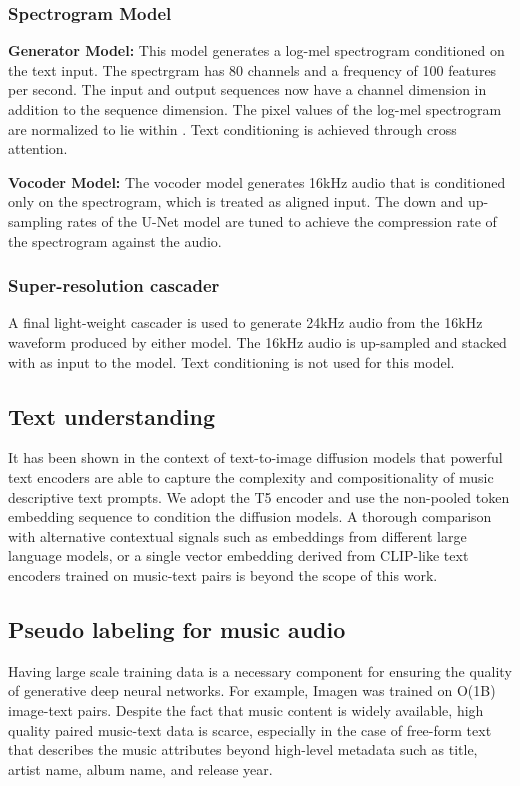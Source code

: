 \documentclass[nohyperref]{article}
\theoremstyle{plain}
\theoremstyle{definition}
\theoremstyle{remark}
\begin{document}
\subsubsection{Spectrogram Model}

\textbf{Generator Model:} This model generates a log-mel spectrogram conditioned on the text input. The spectrgram has 80 channels and a frequency of 100 features per second. The input and output sequences now have a channel dimension in addition to the sequence dimension. The pixel values of the log-mel spectrogram are normalized to lie within . Text conditioning is achieved through cross attention.

\textbf{Vocoder Model:} The vocoder model generates 16kHz audio that is conditioned only on the spectrogram, which is treated as aligned input. The down and up-sampling rates of the U-Net model are tuned to achieve the compression rate of the spectrogram against the audio.

\subsubsection{Super-resolution cascader}

A final light-weight cascader is used to generate 24kHz audio from the 16kHz waveform produced by either model. The 16kHz audio is up-sampled and stacked with  as input to the model. Text conditioning is not used for this model.

\subsection{Text understanding}

It has been shown in the context of text-to-image diffusion models \cite{saharia2022photorealistic,rombach2021highresolution} that powerful text encoders are able to capture the complexity and compositionality of music descriptive text prompts. We adopt the T5 encoder \cite{raffel2020exploring} and use the non-pooled token embedding sequence to condition the diffusion models. A thorough comparison with alternative contextual signals such as embeddings from different large language models, or a single vector embedding derived from CLIP-like \cite{radford2021learning} text encoders trained on music-text pairs \cite{mulan2022,ilaria-contrastive-audio} is beyond the scope of this work.

\subsection{Pseudo labeling for music audio}
Having large scale training data is a necessary component for ensuring the quality of generative deep neural networks. For example, Imagen \cite{saharia2022photorealistic} was trained on O(1B) image-text pairs.
Despite the fact that music content is widely available, high quality paired music-text data is scarce, especially in the case of free-form text that describes the music attributes beyond high-level metadata such as title, artist name, album name, and release year.
\end{document}
